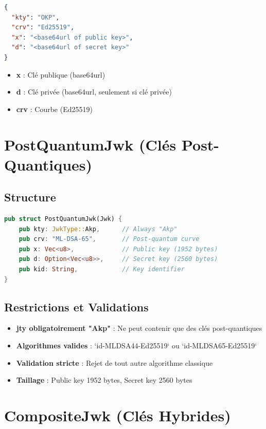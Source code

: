 \documentclass[12pt,a4paper]{report}
\begin{document}
\begin{lstlisting}[language=json]
{
  "kty": "OKP",
  "crv": "Ed25519",
  "x": "<base64url of public key>",
  "d": "<base64url of secret key>"
}
\end{lstlisting}

\begin{itemize}
  \item \textbf{x} : Clé publique (base64url)
  \item \textbf{d} : Clé privée (base64url, seulement si clé privée)
  \item \textbf{crv} : Courbe (Ed25519)
\end{itemize}

\section{PostQuantumJwk (Clés Post-Quantiques)}

\subsection{Structure}

\begin{lstlisting}[language=Rust]
pub struct PostQuantumJwk(Jwk) {
    pub kty: JwkType::Akp,      // Always "Akp"
    pub crv: "ML-DSA-65",       // Post-quantum curve
    pub x: Vec<u8>,             // Public key (1952 bytes)
    pub d: Option<Vec<u8>>,     // Secret key (2560 bytes)
    pub kid: String,            // Key identifier
}
\end{lstlisting}

\subsection{Restrictions et Validations}

\begin{itemize}
  \item \textbf{jty obligatoirement "Akp"} : Ne peut contenir que des clés post-quantiques
  \item \textbf{Algorithmes valides} : `id-MLDSA44-Ed25519` ou `id-MLDSA65-Ed25519`
  \item \textbf{Validation stricte} : Rejet de tout autre algorithme classique
  \item \textbf{Taillage} : Public key 1952 bytes, Secret key 2560 bytes
\end{itemize}

\section{CompositeJwk (Clés Hybrides)}
\end{document}
